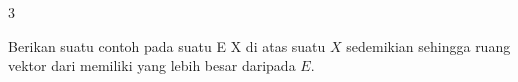 {3}
{

Berikan suatu contoh
pada suatu
 { E } { X
} {}
di atas suatu
$X$ sedemikian sehingga ruang vektor
 dari
memiliki
yang lebih besar daripada
$E$.

}
{} {}
